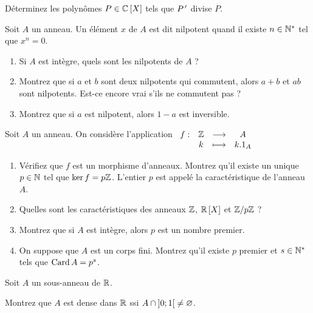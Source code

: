 \begin{exoss}
Déterminez les polynômes \(P\in\poly[\C]\) tels que \(P^{\,\prime}\) divise \(P\).
\end{exoss}

\begin{exoss}
Soit \(A\) un anneau. Un élément \(x\) de \(A\) est dit nilpotent quand il existe \(n\in\mathbb{N}^*\) tel que \(x^n=0\).

\begin{enumerate}
    \item Si \(A\) est intègre, quels sont les nilpotents de \(A\) ? \\
    \item Montrez que si \(a\) et \(b\) sont deux nilpotents qui commutent, alors \(a+b\) et \(ab\) sont nilpotents. Est-ce encore vrai s'ils ne commutent pas ? \\
    \item Montrez que si \(a\) est nilpotent, alors \(1-a\) est inversible.
\end{enumerate}
\end{exoss}

\begin{exoss}
Soit \(A\) un anneau. On considère l'application \(\begin{array}[t]{cccc}f : & \mathbb{Z} & \longrightarrow & A \\ & k & \longmapsto & k.1_A\end{array}\)

\begin{enumerate}
    \item Vérifiez que \(f\) est un morphisme d'anneaux. Montrez qu'il existe un unique \(p\in\mathbb{N}\) tel que \(\ker f=p\mathbb{Z}\). L'entier \(p\) est appelé la caractéristique de l'anneau \(A\). \\
    \item Quelles sont les caractéristiques des anneaux \(\mathbb{Z}\), \(\poly[\R]\) et \(\mathbb{Z}/p\mathbb{Z}\) ? \\
    \item Montrez que si \(A\) est intègre, alors \(p\) est un nombre premier. \\
    \item On suppose que \(A\) est un corps fini. Montrez qu'il existe \(p\) premier et \(s\in\mathbb{N}^*\) tels que \(\operatorname{Card} A=p^s\).
\end{enumerate}
\end{exoss}

\begin{exosss}
Soit \(A\) un sous-anneau de \(\mathbb{R}\).

Montrez que \(A\) est dense dans \(\mathbb{R}\) ssi \(A\cap\left]0;1\right[\not=\varnothing\).
\end{exosss}

